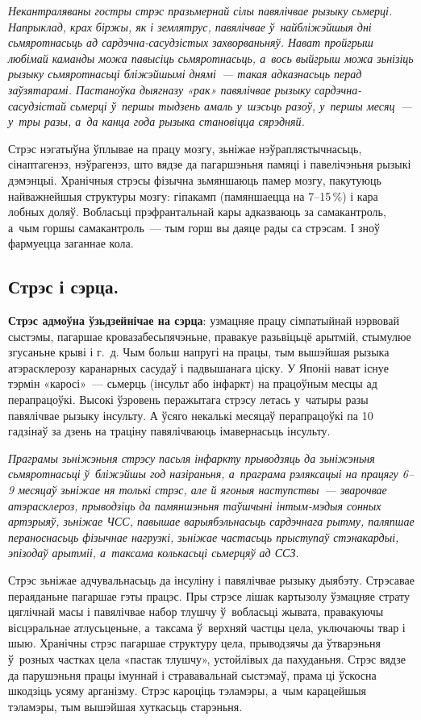 \emph{Некантраляваны гостры стрэс празьмернай сілы павялічвае рызыку сьмерці. Напрыклад, крах біржы, як і землятрус, павялічвае ў~найбліжэйшыя дні сьмяротнасьць ад сардэчна-сасудзістых захворваньняў. Нават пройгрыш любімай каманды можа павысіць сьмяротнасьць, а~вось выйгрыш можа зьнізіць рызыку сьмяротнасьці бліжэйшымі днямі~--- такая адказнасьць перад заўзятарамі. Пастаноўка дыягназу «рак» павялічвае рызыку сардэчна-сасудзістай сьмерці ў~першы тыдзень амаль у~шэсьць разоў, у~першы месяц~--- у~тры разы, а~да канца года рызыка становіцца сярэдняй.}

Стрэс нэгатыўна ўплывае на працу мозгу, зьніжае нэўраплястычнасьць, сінаптагенэз, нэўрагенэз, што вядзе да пагаршэньня памяці і павелічэньня рызыкі дэмэнцыі. Хранічныя стрэсы фізычна зьмяншаюць памер мозгу, пакутуюць найважнейшыя структуры мозгу: гіпакамп (памяншаецца на 7--15\,\%) і кара лобных доляў. Вобласьці прэфрантальнай кары адказваюць за самакантроль, а~чым горшы самакантроль~--- тым горш вы даяце рады са стрэсам. І зноў фармуецца заганнае кола.

\subsection*{Стрэс і сэрца.}

\textbf{Стрэс адмоўна ўзьдзейнічае на сэрца}: узмацняе працу сімпатыйнай нэрвовай сыстэмы, пагаршае кровазабесьпячэньне, правакуе разьвіцьцё арытмій, стымулюе згусаньне крыві і г.~д. Чым больш напругі на працы, тым вышэйшая рызыка атэрасклерозу каранарных сасудаў і падвышанага ціску. У Японіі нават існуе тэрмін «каросі»~--- сьмерць (інсульт або інфаркт) на працоўным месцы ад перапрацоўкі. Высокі ўзровень перажытага стрэсу летась у~чатыры разы павялічвае рызыку інсульту. А ўсяго некалькі месяцаў перапрацоўкі па 10 гадзінаў за дзень на траціну павялічваюць імавернасьць інсульту.

\emph{Праграмы зьніжэньня стрэсу пасьля інфаркту прыводзяць да зьніжэньня сьмяротнасьці ў~бліжэйшы год назіраньня, а~праграма рэляксацыі на працягу 6--9 месяцаў зьніжае ня толькі стрэс, але й ягоныя наступствы~--- зварочвае атэрасклероз, прыводзіць да памяншэньня таўшчыні інтым-мэдыя сонных артэрыяў, зьніжае ЧСС, павышае варыябэльнасьць сардэчнага рытму, паляпшае пераноснасьць фізычнае нагрузкі, зьніжае частасьць прыступаў стэнакардыі, эпізодаў арытміі, а~таксама колькасьці сьмерцяў ад ССЗ.}

Стрэс зьніжае адчувальнасьць да інсуліну і павялічвае рызыку дыябэту. Стрэсавае пераяданьне пагаршае гэты працэс. Пры стрэсе лішак картызолу ўзмацняе страту цяглічнай масы і павялічвае набор тлушчу ў~вобласьці жывата, правакуючы вісцэральнае атлусьценьне, а~таксама ў~верхняй частцы цела, уключаючы твар і шыю. Хранічны стрэс пагаршае структуру цела, прыводзячы да ўтварэньня ў~розных частках цела «пастак тлушчу», устойлівых да пахуданьня. Стрэс вядзе да парушэньня працы імуннай і стрававальнай сыстэмаў, прама ці ўскосна шкодзіць усяму арганізму. Стрэс кароціць тэламэры, а~чым карацейшыя тэламэры, тым вышэйшая хуткасьць старэньня.

